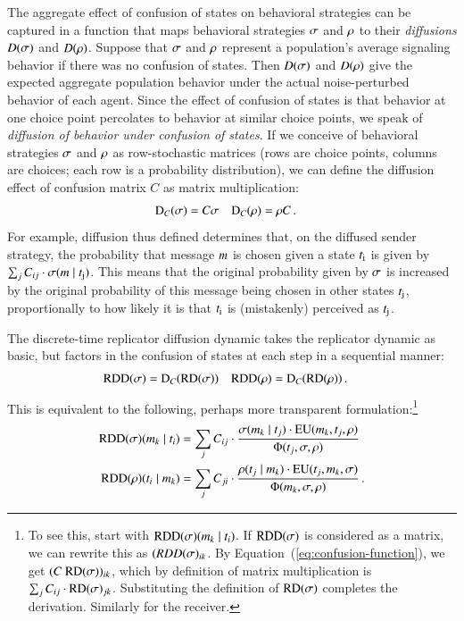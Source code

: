 \documentclass[fleqn,reqno,10pt]{article}
\newcommand{\RD}{\ensuremath{\mathrm{RD}}} %
\newcommand{\RDD}{\ensuremath{\mathrm{RDD}}} %
\newcommand{\Diff}{\ensuremath{\mathrm{D}}} %
\begin{document}
The aggregate effect of confusion of states on behavioral strategies
can be captured in a function that maps behavioral strategies
$\sigma$ and $\rho$ to their \emph{diffusions} $D(\sigma)$ and
$D(\rho)$. Suppose that $\sigma$ and $\rho$ represent a
population's average signaling behavior if there was no confusion of
states. Then $D(\sigma)$ and $D(\rho)$ give the expected aggregate
population behavior under the actual noise-perturbed behavior of each
agent. Since the effect of confusion of states is that behavior at one
choice point percolates to behavior at similar choice points, we speak
of \emph{diffusion of behavior under confusion of states}. If we
conceive of behavioral strategies $\sigma$ and $\rho$ as
row-stochastic matrices (rows are choice points, columns are choices;
each row is a probability distribution), we can define the diffusion effect of
confusion matrix $C$ as matrix multiplication:
\begin{align}
  \label{eq:confusion-function}
  \Diff_C(\Sstrat) & = C \Sstrat &    \Diff_C(\Rstrat) & = \Rstrat C\,.
\end{align}
For example, diffusion thus defined determines that, on the diffused sender strategy, the
probability that message $m$ is chosen given a state $t_{\mathrm{i}}$ is given by
$\sum_{j} C_{ij} \cdot \sigma(m \mid t_{\mathrm{j}})$.  This means that the original
probability given by $\sigma$ is increased by the original probability of this message being
chosen in other states $t_{\mathrm{j}}$, proportionally to how likely it is that $t_{\mathrm{i}}$ is
(mistakenly) perceived as $t_{\mathrm{j}}$.

The discrete-time replicator diffusion dynamic takes the replicator
dynamic as basic, but factors in the confusion of states at each step
in a sequential manner:
\begin{align}
  \label{eq:RDD-Def}
  \RDD(\Sstrat) & = \Diff_C(\RD(\Sstrat)) &   \RDD(\Rstrat) & = \Diff_C(\RD(\Rstrat)) \,.
\end{align}
This is equivalent to the following, perhaps more transparent
formulation:\footnote{To see this, start with $\RDD(\Sstrat)(\messg_k
  \probbar \state_i)$. If $\RDD(\Sstrat)$ is considered as a matrix,
  we can rewrite this as $(RDD(\sigma)_{ik}$. By
  Equation~(\ref{eq:confusion-function}), we get $(C \
  \RD(\Sstrat))_{ik}$, which by definition of matrix multiplication is
  $\sum_j C_{ij} \cdot \RD(\Sstrat)_{jk}$. Substituting the definition
  of $\RD(\Sstrat)$ completes the derivation. Similarly for the
  receiver.}
\begin{align*}
  \RDD(\Sstrat)(\messg_k \probbar \state_i) & = \sum_{j} C_{ij} \cdot
  \frac{\Sstrat(\messg_k \probbar \state_j) \cdot
    \EU(\messg_k, \state_j,\Rstrat)}
  {\Phi(\state_j,\Sstrat, \Rstrat)} \\
    \RDD(\Rstrat)(\state_i \probbar \messg_k) & = \sum_{j} C_{ji} \cdot
  \frac{\Rstrat(\state_j \probbar \messg_k) \cdot
    \EU(\state_j, \messg_k,\Sstrat)} {\Phi(\messg_k,\Sstrat, \Rstrat)}  \,.
\end{align*}
\end{document}
